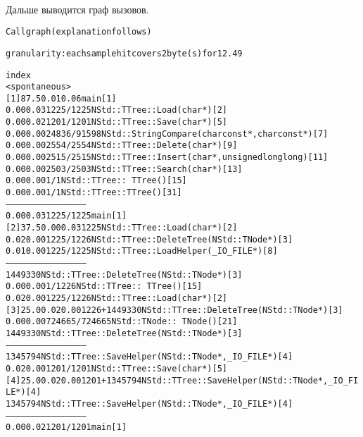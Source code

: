 \\Дальше выводится граф вызовов.
\begin{alltt}
                         Call graph (explanation follows)


granularity: each sample hit covers 2 byte(s) for 12.49% of 0.08 seconds

index % time    self  children    called     name
                                                 <spontaneous>
[1]     87.5    0.01    0.06                 main [1]
                0.00    0.03    1225/1225        NStd::TTree::Load(char*) [2]
                0.00    0.02    1201/1201        NStd::TTree::Save(char*) [5]
                0.00    0.00   24836/91598       NStd::StringCompare(char const*, char const*) [7]
                0.00    0.00    2554/2554        NStd::TTree::Delete(char*) [9]
                0.00    0.00    2515/2515        NStd::TTree::Insert(char*, unsigned long long) [11]
                0.00    0.00    2503/2503        NStd::TTree::Search(char*) [13]
                0.00    0.00       1/1           NStd::TTree::~TTree() [15]
                0.00    0.00       1/1           NStd::TTree::TTree() [31]
-----------------------------------------------
                0.00    0.03    1225/1225        main [1]
[2]     37.5    0.00    0.03    1225         NStd::TTree::Load(char*) [2]
                0.02    0.00    1225/1226        NStd::TTree::DeleteTree(NStd::TNode*) [3]
                0.01    0.00    1225/1225        NStd::TTree::LoadHelper(_IO_FILE*) [8]
-----------------------------------------------
                             1449330             NStd::TTree::DeleteTree(NStd::TNode*) [3]
                0.00    0.00       1/1226        NStd::TTree::~TTree() [15]
                0.02    0.00    1225/1226        NStd::TTree::Load(char*) [2]
[3]     25.0    0.02    0.00    1226+1449330 NStd::TTree::DeleteTree(NStd::TNode*) [3]
                0.00    0.00  724665/724665      NStd::TNode::~TNode() [21]
                             1449330             NStd::TTree::DeleteTree(NStd::TNode*) [3]
-----------------------------------------------
                             1345794             NStd::TTree::SaveHelper(NStd::TNode*, _IO_FILE*) [4]
                0.02    0.00    1201/1201        NStd::TTree::Save(char*) [5]
[4]     25.0    0.02    0.00    1201+1345794 NStd::TTree::SaveHelper(NStd::TNode*, _IO_FILE*) [4]
                             1345794             NStd::TTree::SaveHelper(NStd::TNode*, _IO_FILE*) [4]
-----------------------------------------------
                0.00    0.02    1201/1201        main [1]

\end{alltt}
